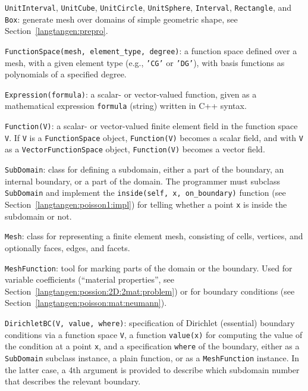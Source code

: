 {\fontsize{10pt}{10pt}\texttt{UnitInterval}}, {\fontsize{10pt}{10pt}\texttt{UnitCube}}, {\fontsize{10pt}{10pt}\texttt{UnitCircle}}, {\fontsize{10pt}{10pt}\texttt{UnitSphere}},
{\fontsize{10pt}{10pt}\texttt{Interval}}, {\fontsize{10pt}{10pt}\texttt{Rectangle}}, and {\fontsize{10pt}{10pt}\texttt{Box}}: generate mesh over
domains of simple geometric shape, see Section~\ref{langtangen:prepro}.\gln

{\fontsize{10pt}{10pt}\verb!FunctionSpace(mesh, element_type, degree)!}: 
a function space defined over a mesh, with a given element type
(e.g., {\fontsize{10pt}{10pt}\texttt{'CG'}} or {\fontsize{10pt}{10pt}\texttt{'DG'}}), with basis functions as polynomials of
a specified degree.\gln

{\fontsize{10pt}{10pt}\texttt{Expression(formula)}}: a scalar- or vector-valued function, given as a
mathematical expression {\fontsize{10pt}{10pt}\texttt{formula}} (string) written in C++ syntax.
\gln

{\fontsize{10pt}{10pt}\texttt{Function(V)}}: a scalar- or vector-valued finite element field in
the function space {\fontsize{10pt}{10pt}\texttt{V}}. If {\fontsize{10pt}{10pt}\texttt{V}} is a {\fontsize{10pt}{10pt}\texttt{FunctionSpace}} object,
{\fontsize{10pt}{10pt}\texttt{Function(V)}} becomes a scalar field, and with {\fontsize{10pt}{10pt}\texttt{V}} as a
{\fontsize{10pt}{10pt}\texttt{VectorFunctionSpace}} object, {\fontsize{10pt}{10pt}\texttt{Function(V)}} becomes a
vector field.\gln

{\fontsize{10pt}{10pt}\texttt{SubDomain}}: class for defining a subdomain, either a part of the
boundary, an internal boundary, or a part of the domain.
The programmer must subclass {\fontsize{10pt}{10pt}\texttt{SubDomain}} and implement the
{\fontsize{10pt}{10pt}\verb!inside(self, x, on_boundary)!} function (see Section~\ref{langtangen:poisson1:impl}) for telling whether a point {\fontsize{10pt}{10pt}\texttt{x}} is inside the subdomain or not.
\gln

{\fontsize{10pt}{10pt}\texttt{Mesh}}: class for representing a finite element mesh, consisting of
cells, vertices, and optionally faces, edges, and facets.

{\fontsize{10pt}{10pt}\texttt{MeshFunction}}: tool for marking parts of the domain or the boundary.
Used for variable coefficients (``material properties'', see
Section~\ref{langtangen:possion:2D:2mat:problem}) or for
boundary conditions (see Section~\ref{langtangen:poisson:mat:neumann}).\gln

{\fontsize{10pt}{10pt}\texttt{DirichletBC(V, value, where)}}: specification of Dirichlet (essential)
boundary conditions via a function space {\fontsize{10pt}{10pt}\texttt{V}}, a function
{\fontsize{10pt}{10pt}\texttt{value(x)}} for computing the value of the condition at a point {\fontsize{10pt}{10pt}\texttt{x}},
and a specification {\fontsize{10pt}{10pt}\texttt{where}} of the boundary, either as a
{\fontsize{10pt}{10pt}\texttt{SubDomain}} subclass instance, a plain function, or as a 
{\fontsize{10pt}{10pt}\texttt{MeshFunction}} instance.
In the latter case, a 4th argument is provided to describe which subdomain
number that describes the relevant boundary.\gln

